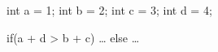 \begin{minipage}[t]{1.5in}
\begin{AVerb}[numbers=left]
int a = 1; \label{lst_back3_start}
int b = 2; 
int c = 3; 
int d = 4; \label{lst_back3_end}

if(a + d > b + c)
  \dots
else
  \dots
\end{AVerb}
\end{minipage}
